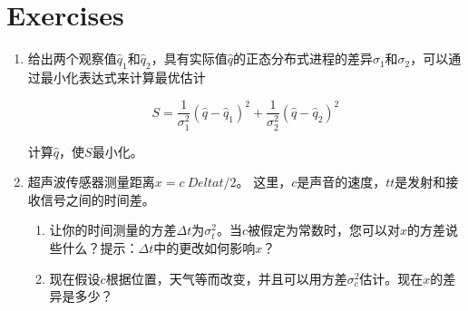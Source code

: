 \section*{Exercises}\small
\begin{enumerate}

\item 给出两个观察值$\hat{q}_1$和$\hat{q}_2$，具有实际值$\hat{q}$的正态分布式进程的差异$\sigma_1$和$\sigma_2$，可以通过最小化表达式来计算最优估计

\begin{equation}
\nonumber
S=\frac{1}{\sigma_1^2}(\hat{q}-\hat{q}_1)^2+\frac{1}{\sigma_2^2}(\hat{q}-\hat{q}_2)^2
\end{equation}

计算$\hat{q}$，使$S$最小化。


\item 超声波传感器测量距离$ x = c \ Delta t / 2 $。 这里，$ c $是声音的速度，$ tt $是发射和接收信号之间的时间差。

\begin{enumerate}

\item 让你的时间测量的方差$\Delta t$为$\sigma_t^2$。当$c$被假定为常数时，您可以对$x$的方差说些什么？提示：$\Delta t$中的更改如何影响$x$？
\item 现在假设$c$根据位置，天气等而改变，并且可以用方差$\sigma_c^2$估计。现在$x$的差异是多少？
\end{enumerate}


\end{enumerate}
